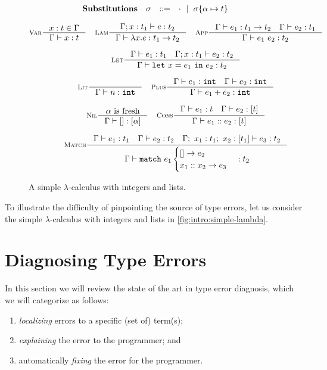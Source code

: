 \begin{figure}[p]
\[{\begin{array}{rrcl}
\mathbf{Substitutions}
& \sigma & ::= & \cdot \ \mid\  \sigma \{\alpha \mapsto t\}\\
\end{array}
}
\]
\begin{framed}
\begin{gather*}
\inference[\textsc{Var}]
  {x:t \in \Gamma}
  {\jtype{\Gamma}{x}{t}}
\quad
\inference[\textsc{Lam}]
  {\jtype{\Gamma;x:t_1}{e}{t_2}}
  {\jtype{\Gamma}{\efun{x}{e}}{\tarr{t_1}{t_2}}}
\quad
\inference[\textsc{App}]
  {\jtype{\Gamma}{e_1}{\tarr{t_1}{t_2}}
   \quad
   \jtype{\Gamma}{e_2}{t_1}}
  {\jtype{\Gamma}{\eapp{e_1}{e_2}}{t_2}}
\\[0.1in]
\inference[\textsc{Let}]
  {\jtype{\Gamma}{e_1}{t_1}
   \quad
   \jtype{\Gamma;x:t_1}{e_2}{t_2}}
  {\jtype{\Gamma}{\elet{x}{e_1}{e_2}}{t_2}}
\\[0.1in]
\inference[\textsc{Lit}]
  {}
  {\jtype{\Gamma}{n}{\tint}}
\quad
\inference[\textsc{Plus}]
  {\jtype{\Gamma}{e_1}{\tint} \quad \jtype{\Gamma}{e_2}{\tint}}
  {\jtype{\Gamma}{\eplus{e_1}{e_2}}{\tint}}
\\[0.1in]
\inference[\textsc{Nil}]
  {\alpha \text{ is fresh}}
  {\jtype{\Gamma}{\enil}{\tlist{\alpha}}}
\quad
\inference[\textsc{Cons}]
  {\jtype{\Gamma}{e_1}{t} \quad \jtype{\Gamma}{e_2}{\tlist{t}}}
  {\jtype{\Gamma}{\econs{e_1}{e_2}}{\tlist{t}}}
\\[0.1in]
\inference[\textsc{Match}]
  {\jtype{\Gamma}{e_1}{t_1}
    \quad
   \jtype{\Gamma}{e_2}{t_2}
    \quad
   \jtype{\Gamma;\ x_1:t_1;\ x_2:\tlist{t_1}}{e_3}{t_2}
  }
  {\jtype{\Gamma}{\elcase{e_1}{e_2}{x_1}{x_2}{e_3}}{t_2}}
\end{gather*}
\end{framed}
\caption{A simple $\lambda$-calculus with integers and lists.
}
\label{fig:intro:simple-lambda}
\end{figure}

To illustrate the difficulty of pinpointing the source of type errors,
let us consider the simple $\lambda$-calculus with integers and lists in
\autoref{fig:intro:simple-lambda}.

\section{Diagnosing Type Errors}
\label{sec:diagnosing-type-errors}
In this section we will review the state of the art in type error
diagnosis, which we will categorize as follows:
\begin{enumerate}
\item \emph{localizing} errors to a specific (set of) term(s);
\item \emph{explaining} the error to the programmer; and
\item automatically \emph{fixing} the error for the programmer.
\end{enumerate}

